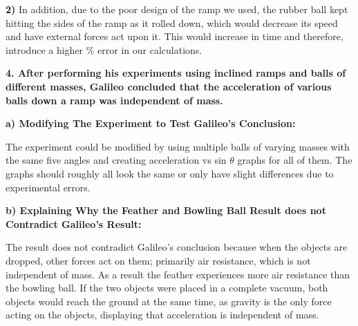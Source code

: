 \documentclass[12pt,letterpaper]{article}
\newcommand\tab[1][1cm]{\hspace*{#1}}
\begin{document}
\vspace{4mm}

\noindent
\tab \textbf{2)} In addition, due to the poor design of the ramp we used, the rubber ball kept \tab hitting the sides of the ramp as it rolled down, which would decrease its speed and \tab have external forces act upon it. This would increase in time and therefore, introduce \tab a higher \% error in our calculations.

\vspace{8mm}
\noindent
\textbf{4. After performing his experiments using inclined ramps and balls of different masses, Galileo concluded that the acceleration of various balls down a ramp was independent of mass.}

\noindent
\tab \textbf{a) Modifying The Experiment to Test Galileo's Conclusion:}

\noindent
\tab The experiment could be modified by using multiple balls of varying masses with the \tab same five angles and creating acceleration vs sin $\theta$ graphs for all of them. The graphs \tab should roughly all look the same or only have slight differences due to experimental \tab errors.

\noindent
\tab \textbf{b) Explaining Why the Feather and Bowling Ball Result does not Contradict \tab Galileo's Result:}

\noindent
\tab The result does not contradict Galileo’s conclusion because when the objects are \tab dropped, other forces act on them; primarily air resistance, which is not independent \tab of mass. As a result the feather experiences more air resistance than the bowling ball. \tab If the two objects were placed in a complete vacuum, both objects would reach the \tab ground at the same time, as gravity is the only force acting on the objects, displaying \tab that acceleration is independent of mass.
\end{document}
